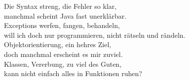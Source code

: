 \begin{multicols*}{5}
Die Syntax streng, die Fehler so klar,\\
manchmal scheint Java fast unerklärbar.\\
Exceptions werfen, fangen, behandeln,\\
will ich doch nur programmieren, nicht rätseln und rändeln.\\

Objektorientierung, ein hehres Ziel,\\
doch manchmal erscheint es mir zuviel.\\
Klassen, Vererbung, zu viel des Guten,\\
kann nicht einfach alles in Funktionen ruhen?\\
\end{multicols*}

% 

